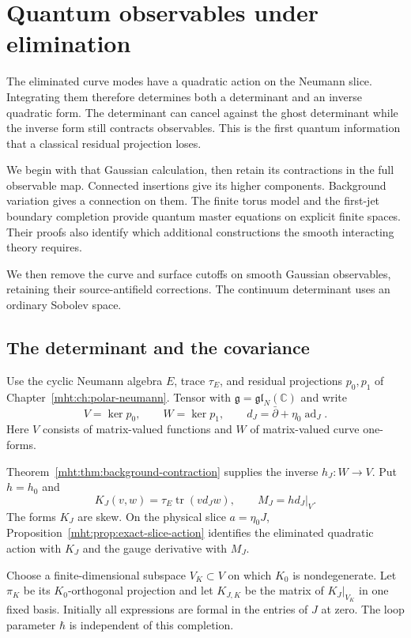 \chapter{Quantum observables under elimination}
\label{mht:ch:quantum-elimination}

The eliminated curve modes have a quadratic action on the Neumann
slice. Integrating them therefore determines both a determinant and
an inverse quadratic form. The determinant can cancel against the
ghost determinant while the inverse form still contracts observables.
This is the first quantum information that a classical residual
projection loses.

We begin with that Gaussian calculation, then retain its contractions
in the full observable map. Connected insertions give its higher
components. Background variation gives a connection on them.
The finite torus model and the first-jet boundary completion provide
quantum master equations on explicit finite spaces. Their proofs also
identify which additional constructions the smooth interacting theory
requires.

We then remove the curve and surface cutoffs on smooth
Gaussian observables, retaining their source-antifield corrections.
The continuum determinant uses an ordinary Sobolev space.

\section{The determinant and the covariance}

Use the cyclic Neumann algebra $E$, trace $\tau_E$, and residual
projections $p_0,p_1$ of Chapter~\ref{mht:ch:polar-neumann}.
Tensor with $\mathfrak g=\mathfrak{gl}_N(\mathbb C)$ and write
\[
 V=\ker p_0,\qquad W=\ker p_1,\qquad
 d_J=\bar\partial+\eta_0\operatorname{ad}_J.
\]
Here $V$ consists of matrix-valued functions and $W$ of matrix-valued
curve one-forms.

Theorem~\ref{mht:thm:background-contraction} supplies
the inverse $h_J:W\to V$. Put $h=h_0$ and
\[
 K_J(v,w)=\tau_E\operatorname{tr}(v d_Jw),\qquad
 M_J=h d_J|_V.
\]
The forms $K_J$ are skew. On the physical slice
$a=\eta_0J$, Proposition~\ref{mht:prop:exact-slice-action} identifies
the eliminated quadratic action with $K_J$ and the gauge derivative
with $M_J$.

Choose a finite-dimensional subspace $V_K\subset V$ on which $K_0$
is nondegenerate. Let $\pi_K$ be its $K_0$-orthogonal projection
and let $K_{J,K}$ be the matrix of $K_J|_{V_K}$ in one fixed basis.
Initially all expressions are formal in the entries of $J$ at zero.
The loop parameter $\hbar$ is independent of this completion.

